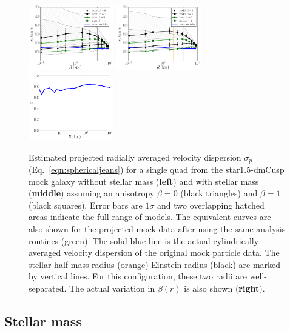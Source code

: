 \documentclass[galley,usenatbib]{mn2e}
\newcommand{\eqnrefp}[1] {(Eq.~\ref{#1})}
\newcommand{\mockBC}{{\sc star1.5-dmCusp}}
\begin{document}
\begin{figure}
\includegraphics[width=0.33\textwidth]{BCQuadR1a_Tms_sigp-1.pdf}
\includegraphics[width=0.33\textwidth]{BCQuadR1a_TmS_sigp-2.pdf}
\includegraphics[width=0.33\textwidth]{BC_beta.pdf}
\caption{ Estimated projected radially averaged velocity dispersion $\sigma_p$
\eqnrefp{eqn:sphericaljeans} for a single quad from the \mockBC{} mock galaxy
without stellar mass (\textbf{left}) and with stellar mass (\textbf{middle})
assuming an anisotropy $\beta=0$ (black triangles) and $\beta=1$ (black squares).
Error bars are $1\sigma$ and two overlapping hatched areas indicate the full range of models.
The equivalent curves are also shown for the projected mock data after using
the same analysis routines (green). The solid blue line is the actual
cylindrically averaged velocity dispersion of the original mock particle data.
The stellar half mass radius (orange) Einstein radius (black) are marked by
vertical lines. For this configuration, these two radii are well-separated. The
actual variation in $\beta(r)$ is also shown (\textbf{right}).}
\label{fig:sigp} \end{figure}
\subsection{Stellar mass}
\label{stellar mass}
\end{document}
